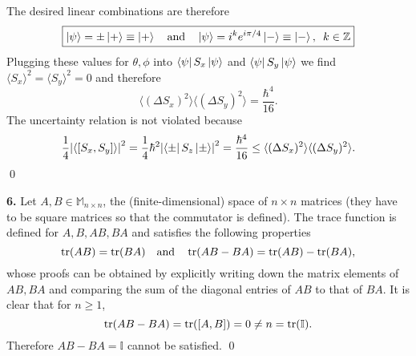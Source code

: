 \documentclass{article}
\theoremstyle{definition}
\newcommand{\f}[2]{\frac{#1}{#2}}
\begin{document}
The desired linear combinations are therefore
\begin{align*}
\boxed{\ket{\psi} = \pm \ket{+} \equiv \ket{+}\quad \text{and} \quad \ket{\psi} =  i^k e^{i\pi/4}\ket{-} \equiv \ket{-}, \,\,\, k\in \mathbb{Z}}
\end{align*}
Plugging these values for $\theta,\phi$ into $\bra{\psi} S_x \ket{\psi}$ and $\bra{\psi} S_y \ket{\psi}$ we find $\langle S_x\rangle^2 = \langle S_y\rangle^2 = 0$ and therefore
\begin{equation*}
\langle (\Delta S_x)^2\rangle \langle (\Delta S_y)^2\rangle = \f{\hbar^4}{16}.
\end{equation*}
The uncertainty relation is not violated because
\begin{equation*}
\f{1}{4}\abs{\langle [S_x, S_y]\rangle}^2 = \f{1}{4}\hbar^2 \abs{\bra{\pm}S_z\ket{\pm}}^2 = \f{\hbar^4}{16} \leq  \langle (\Delta S_x)^2\rangle \langle (\Delta S_y)^2\rangle.
\end{equation*}\qed
	
	
	
	
	
	
	
	
\newpage




\noindent \textbf{6.} Let $A,B \in \mathbb{M}_{n\times n}$, the (finite-dimensional) space of $n\times n$ matrices (they have to be square matrices so that the commutator is defined). The trace function is defined for $A,B,AB,BA$ and satisfies the following properties
\begin{equation*}
\tr(AB) = \tr(BA)  \quad \text{and} \quad \tr(AB-BA) = \tr(AB) - \tr(BA),
\end{equation*}
whose proofs can be obtained by explicitly writing down the matrix elements of $AB,BA$ and comparing the sum of the diagonal entries of $AB$ to that of $BA$. It is clear that for $n\geq 1$,
\begin{equation*}
\tr(AB-BA) = \tr([A,B]) = 0 \neq n = \tr(\mathbb{I}). 
\end{equation*}
Therefore $AB-BA = \mathbb{I}$ cannot be satisfied. \qed
	

\newpage
\end{document}
